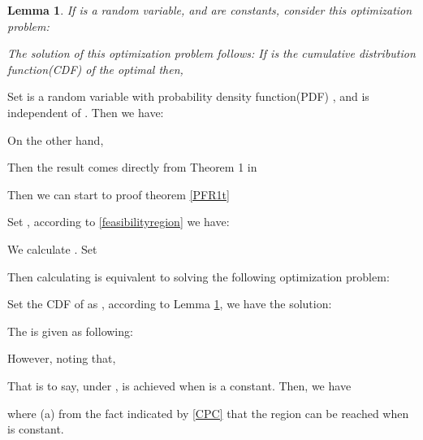 \documentclass[12pt, draftclsnofoot, journal, letterpaper, onecolumn]{IEEEtran}
\newtheorem{lemma}{Lemma}[section]
\begin{document}
\begin{lemma}\label{max}
If  is a random variable,  and  are constants, consider this optimization problem:

The solution of this optimization problem follows:
If  is the cumulative distribution function(CDF) of the optimal  then,\\

\end{lemma}
\begin{IEEEproof}
Set  is a random variable with probability density function(PDF) , and  is independent of .
Then we have:

On the other hand,

Then the result comes directly from Theorem 1 in \cite{RPC3}
\end{IEEEproof}

Then we can start to proof theorem \ref{PFR1t}
\begin{IEEEproof}
Set , according to \eqref{feasibilityregion} we have:




We calculate . Set

Then calculating  is equivalent to solving the following optimization problem:


Set the CDF of  as , according to Lemma \ref{max}, we have the solution:

The  is given as following:

However, noting that,

That is to say, under ,  is achieved when  is a constant.
Then, we have

where (a) from the fact indicated by \eqref{CPC} that the region can be reached when  is constant.
\end{IEEEproof}
\end{document}
